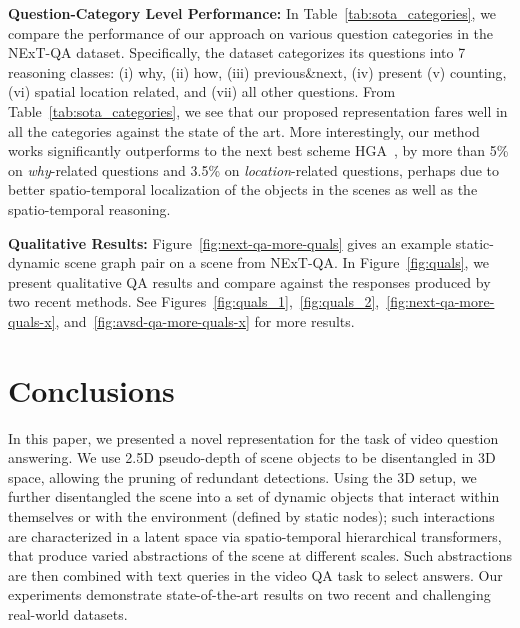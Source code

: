 \documentclass[letterpaper]{article}
\begin{document}
\noindent\textbf{Question-Category Level Performance:} In Table~\ref{tab:sota_categories}, we compare the performance of our \name approach on various question categories in the NExT-QA dataset. Specifically, the dataset categorizes its questions into 7 reasoning classes: (i) why, (ii) how, (iii) previous\&next, (iv) present (v) counting, (vi) spatial location related, and (vii) all other questions. From Table~\ref{tab:sota_categories}, we see that our proposed representation fares well in all the categories against the state of the art. More interestingly, our method works significantly outperforms to the next best scheme HGA~\cite{jiang2020reasoning}, by more than 5\% on \emph{why}-related questions and 3.5\% on \emph{location}-related questions, perhaps due to better spatio-temporal localization of the objects in the scenes as well as the spatio-temporal reasoning.

\noindent\textbf{Qualitative Results:} Figure~\ref{fig:next-qa-more-quals} gives an example static-dynamic scene graph pair on a scene from NExT-QA. In Figure~\ref{fig:quals}, we present qualitative QA results and compare against the responses produced by two recent methods.  See  Figures~\ref{fig:quals_1},~\ref{fig:quals_2},~\ref{fig:next-qa-more-quals-x}, and~\ref{fig:avsd-qa-more-quals-x} for more results.

\section{Conclusions}
In this paper, we presented a novel \name representation for the task of video question answering. We use 2.5D pseudo-depth of scene objects to be disentangled in 3D space, allowing the pruning of redundant detections. Using the 3D setup, we further disentangled the scene into a set of dynamic objects that interact within themselves or with the environment (defined by static nodes); such interactions are characterized in a latent space via spatio-temporal hierarchical transformers, that produce varied abstractions of the scene at different scales. Such abstractions are then combined with text queries in the video QA task to select answers. Our experiments demonstrate state-of-the-art results on two recent and challenging real-world datasets. %
\end{document}
